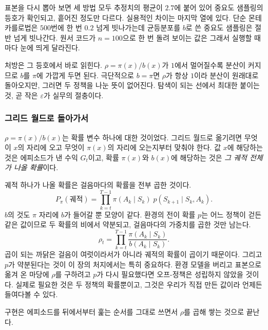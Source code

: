 \documentclass[11pt,a4paper]{article}
\begin{document}
표본을 다시 뽑아 보면 세 방법 모두 추정치의 평균이 $2.7$에 붙어 있어 중요도 샘플링의 등호가
확인되고, 흩어진 정도만 다르다. 실용적인 차이는 마지막 열에 있다. 단순 몬테카를로법은 $500$번에 한 번 $0.2$ 넘게 빗나가는데
균등분포를 $b$로 쓴 중요도 샘플링은 절반 넘게 빗나간다. 원서 코드가 $n=100$으로 한 번 돌려 보이는
값은 그래서 실행할 때마다 눈에 띄게 달라진다.

처방은 그 등호에서 바로 읽힌다. $\rho = \pi(x)/b(x)$가 $1$에서 멀어질수록 분산이 커지므로
$b$를 $\pi$에 가깝게 두면 된다. 극단적으로 $b=\pi$면 $\rho$가 항상 $1$이라 분산이 원래대로
돌아오지만, 그러면 두 정책을 나눈 뜻이 없어진다. 탐색이 되는 선에서 최대한 붙이는 것, 곧 작은
$\varepsilon$가 실무의 절충이다.

\subsubsection{그리드 월드로 돌아가서}

$\rho = \pi(x)/b(x)$는 확률 변수 하나에 대한 것이었다. 그리드 월드로 옮기려면 무엇이 $x$의 자리에
오고 무엇이 $\pi(x)$의 자리에 오는지부터 맞춰야 한다. 값 $x$에 해당하는 것은 에피소드가 낸 수익
$G_t$이고, 확률 $\pi(x)$와 $b(x)$에 해당하는 것은 \emph{그 궤적 전체가 나올 확률}이다.

궤적 하나가 나올 확률은 걸음마다의 확률을 전부 곱한 것이다.
\begin{equation*}
  P_\pi(\text{궤적}) = \prod_{k=t}^{T-1} \pi(A_k \mid S_k)\; p(S_{k+1} \mid S_k, A_k).
\end{equation*}
$b$의 것도 $\pi$ 자리에 $b$가 들어갈 뿐 모양이 같다. 환경의 전이 확률 $p$는 어느 정책이 걷든 같은
값이므로 두 확률의 비에서 약분되고, 걸음마다의 가중치를 곱한 것만 남는다.
\begin{equation*}
  \rho_{t} = \prod_{k=t}^{T-1} \frac{\pi(A_k \mid S_k)}{b(A_k \mid S_k)}.
\end{equation*}
곱이 되는 까닭은 걸음이 여럿이라서가 아니라 궤적의 확률이 곱이기 때문이다. 그리고 $p$가
약분된다는 것이 이 장의 처지에서는 특히 중요하다. 환경 모델을 버리고 표본으로 옮겨 온 마당에
$\rho$를 구하려고 $p$가 다시 필요했다면 오프-정책은 성립하지 않았을 것이다. 실제로 필요한 것은 두
정책의 확률뿐이고, 그것은 우리가 직접 만든 값이라 언제든 들여다볼 수 있다.

구현은 에피소드를 뒤에서부터 훑는 순서를 그대로 쓰면서 $\rho$를 곱해
쌓는 것으로 끝난다.
\end{document}
